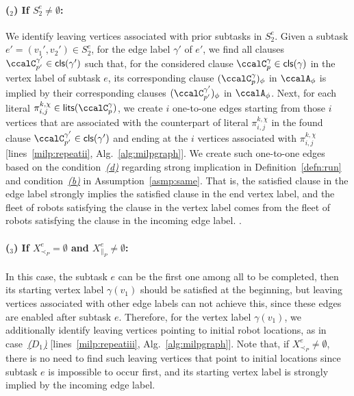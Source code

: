 \documentclass[Afour,sageh,times]{sagej}
\newcounter{mycounter}
\newcommand{\clause}[1]{\mathsf{cls}(#1)}
\newcommand{\autop}{\ccalA_{\phi}}
\renewcommand{\ap}[3]{\mathcal{\pi}_{{#1},{#2}}^{#3}}
\begin{document}
\paragraph{($_2$) If $S_2^e \neq \emptyset$:}\label{edge:vertex2}  We  identify leaving vertices associated with prior subtasks in $S_2^e$. Given a subtask $e' = (v_1', v_2') \in S^e_2$, for the edge label $\gamma'$ of $e'$, we find all clauses $\ccalC_{p'}^{\gamma'} \in  \clause{\gamma'}$ such that, for the considered  clause $\ccalC_p^\gamma \in \clause{\gamma} $ in the vertex label of subtask $e$, its corresponding clause $(\ccalC_p^\gamma)_{\phi}$ in $\autop$ is implied by  their corresponding clauses $(\ccalC_{p'}^{\gamma'})_{\phi}$ in $\autop$. Next, for each literal $\ap{i}{j}{k,\chi} \in \mathsf{lits}(\ccalC_p^\gamma)$, we create $i$ one-to-one edges starting from those $i$ vertices that are associated with the counterpart  of literal  $\ap{i}{j}{k,\chi}$ in the found clause  $\ccalC_{p'}^{\gamma'} \in \clause{\gamma'}$  and ending at the $i$ vertices associated with $\ap{i}{j}{k,\chi}$ [lines~\ref{milp:repeatii},  Alg.~\ref{alg:milpgraph}]. We create such one-to-one edges based on the condition~\hyperref[cond:d]{\it (d)} regarding strong implication in Definition~\ref{defn:run} and condition~\hyperref[asmp:b]{\it (b)} in Assumption~\ref{asmp:same}. That is,  the satisfied clause in the edge label strongly implies the satisfied clause in the end vertex label, and the fleet of robots satisfying the clause in the vertex label comes from the fleet of robots satisfying the clause in the incoming edge label.
.

\paragraph{($_3$) If $X_{\prec_P}^e = \emptyset$ and $X_{\|_P}^e \neq \emptyset$:}\label{edge:vertex3} In this case, the subtask $e$ can be the first one among all to be completed, then  its starting vertex label $\gamma(v_1)$  should be satisfied at the beginning, but leaving vertices associated with other edge labels can not achieve this, since these edges are enabled after subtask $e$. Therefore, for the vertex label $\gamma(v_1)$, we additionally identify leaving vertices pointing to initial robot locations, as in case~\hyperref[sec:a]{\it ($D_1$)} [lines~\ref{milp:repeatiii},  Alg.~\ref{alg:milpgraph}]. %
Note that, if $X_{\prec_P }^e \neq \emptyset$,  there is no need to find such leaving vertices that point to initial locations since subtask $e$ is impossible to occur first, and its starting vertex label is strongly implied by the incoming edge label.
\end{document}
